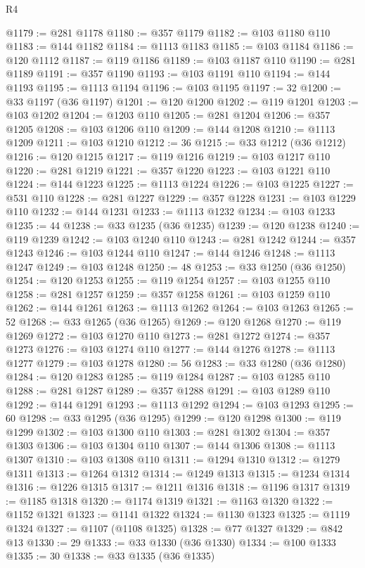 \begin{lexlean}{R4}
\begin{coremodule}
@1179 := @281 @1178
@1180 := @357 @1179
@1182 := @103 @1180 @110
@1183 := @144 @1182
@1184 := @1113 @1183
@1185 := @103 @1184
@1186 := @120 @1112
@1187 := @119 @1186
@1189 := @103 @1187 @110
@1190 := @281 @1189
@1191 := @357 @1190
@1193 := @103 @1191 @110
@1194 := @144 @1193
@1195 := @1113 @1194
@1196 := @103 @1195
@1197 := 32
@1200 := @33 @1197 (@36 @1197)
@1201 := @120 @1200
@1202 := @119 @1201
@1203 := @103 @1202
@1204 := @1203 @110
@1205 := @281 @1204
@1206 := @357 @1205
@1208 := @103 @1206 @110
@1209 := @144 @1208
@1210 := @1113 @1209
@1211 := @103 @1210
@1212 := 36
@1215 := @33 @1212 (@36 @1212)
@1216 := @120 @1215
@1217 := @119 @1216
@1219 := @103 @1217 @110
@1220 := @281 @1219
@1221 := @357 @1220
@1223 := @103 @1221 @110
@1224 := @144 @1223
@1225 := @1113 @1224
@1226 := @103 @1225
@1227 := @531 @110
@1228 := @281 @1227
@1229 := @357 @1228
@1231 := @103 @1229 @110
@1232 := @144 @1231
@1233 := @1113 @1232
@1234 := @103 @1233
@1235 := 44
@1238 := @33 @1235 (@36 @1235)
@1239 := @120 @1238
@1240 := @119 @1239
@1242 := @103 @1240 @110
@1243 := @281 @1242
@1244 := @357 @1243
@1246 := @103 @1244 @110
@1247 := @144 @1246
@1248 := @1113 @1247
@1249 := @103 @1248
@1250 := 48
@1253 := @33 @1250 (@36 @1250)
@1254 := @120 @1253
@1255 := @119 @1254
@1257 := @103 @1255 @110
@1258 := @281 @1257
@1259 := @357 @1258
@1261 := @103 @1259 @110
@1262 := @144 @1261
@1263 := @1113 @1262
@1264 := @103 @1263
@1265 := 52
@1268 := @33 @1265 (@36 @1265)
@1269 := @120 @1268
@1270 := @119 @1269
@1272 := @103 @1270 @110
@1273 := @281 @1272
@1274 := @357 @1273
@1276 := @103 @1274 @110
@1277 := @144 @1276
@1278 := @1113 @1277
@1279 := @103 @1278
@1280 := 56
@1283 := @33 @1280 (@36 @1280)
@1284 := @120 @1283
@1285 := @119 @1284
@1287 := @103 @1285 @110
@1288 := @281 @1287
@1289 := @357 @1288
@1291 := @103 @1289 @110
@1292 := @144 @1291
@1293 := @1113 @1292
@1294 := @103 @1293
@1295 := 60
@1298 := @33 @1295 (@36 @1295)
@1299 := @120 @1298
@1300 := @119 @1299
@1302 := @103 @1300 @110
@1303 := @281 @1302
@1304 := @357 @1303
@1306 := @103 @1304 @110
@1307 := @144 @1306
@1308 := @1113 @1307
@1310 := @103 @1308 @110
@1311 := @1294 @1310
@1312 := @1279 @1311
@1313 := @1264 @1312
@1314 := @1249 @1313
@1315 := @1234 @1314
@1316 := @1226 @1315
@1317 := @1211 @1316
@1318 := @1196 @1317
@1319 := @1185 @1318
@1320 := @1174 @1319
@1321 := @1163 @1320
@1322 := @1152 @1321
@1323 := @1141 @1322
@1324 := @1130 @1323
@1325 := @1119 @1324
@1327 := @1107 (@1108 @1325)
@1328 := @77 @1327
@1329 := @842 @13
@1330 := 29
@1333 := @33 @1330 (@36 @1330)
@1334 := @100 @1333
@1335 := 30
@1338 := @33 @1335 (@36 @1335)

\end{coremodule}
\end{lexlean}
